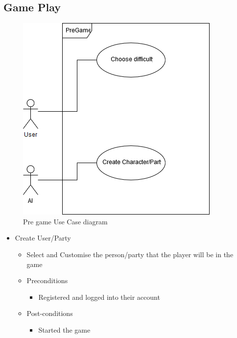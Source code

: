 \documentclass{article}
\begin{document}
   \subsection{Game Play}
   	\begin{figure}[h!]
        \includegraphics[width=0.8\linewidth]{Images/PreGame.png}
        \caption{Pre game Use Case diagram}
    \end{figure}
   	\newpage
   	\begin{itemize}
   		\item Create User/Party
			\begin{itemize}
				\item Select and Customise the person/party that the player will be in the game
				\item Preconditions
				\begin{itemize}
					\item Registered and logged into their account
				\end{itemize}
				\item Post-conditions
				\begin{itemize}
					\item Started the game
				\end{itemize}
			\end{itemize}
	\end{itemize}
	
\end{document}
